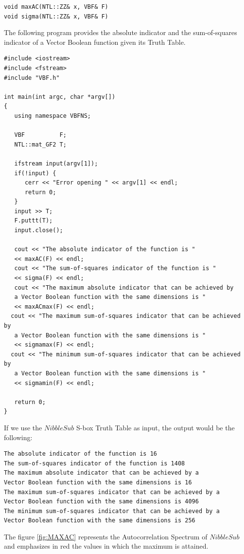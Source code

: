 \begin{verbatim}
void maxAC(NTL::ZZ& x, VBF& F)
void sigma(NTL::ZZ& x, VBF& F)
\end{verbatim}

\begin{example}
The following program provides the absolute indicator and the sum-of-squares indicator of a Vector Boolean function given its Truth Table.

\begin{verbatim}
#include <iostream>
#include <fstream>
#include "VBF.h"

int main(int argc, char *argv[])
{
   using namespace VBFNS;

   VBF          F;
   NTL::mat_GF2 T;

   ifstream input(argv[1]);
   if(!input) {
      cerr << "Error opening " << argv[1] << endl;
      return 0;
   }
   input >> T;
   F.puttt(T);
   input.close();

   cout << "The absolute indicator of the function is " 
   << maxAC(F) << endl;
   cout << "The sum-of-squares indicator of the function is "
   << sigma(F) << endl;
   cout << "The maximum absolute indicator that can be achieved by 
   a Vector Boolean function with the same dimensions is " 
   << maxACmax(F) << endl;
  cout << "The maximum sum-of-squares indicator that can be achieved by 
   a Vector Boolean function with the same dimensions is " 
   << sigmamax(F) << endl;
  cout << "The minimum sum-of-squares indicator that can be achieved by 
   a Vector Boolean function with the same dimensions is " 
   << sigmamin(F) << endl;

   return 0;
}
\end{verbatim}

If we use the $NibbleSub$ S-box Truth Table as input, the output would be the following:

\begin{verbatim}
The absolute indicator of the function is 16
The sum-of-squares indicator of the function is 1408
The maximum absolute indicator that can be achieved by a 
Vector Boolean function with the same dimensions is 16
The maximum sum-of-squares indicator that can be achieved by a 
Vector Boolean function with the same dimensions is 4096
The minimum sum-of-squares indicator that can be achieved by a 
Vector Boolean function with the same dimensions is 256
\end{verbatim}

The figure \ref{fig:MAXAC} represents the Autocorrelation Spectrum of $NibbleSub$ and emphasizes in red the values in which the maximum is attained.


\end{example}
